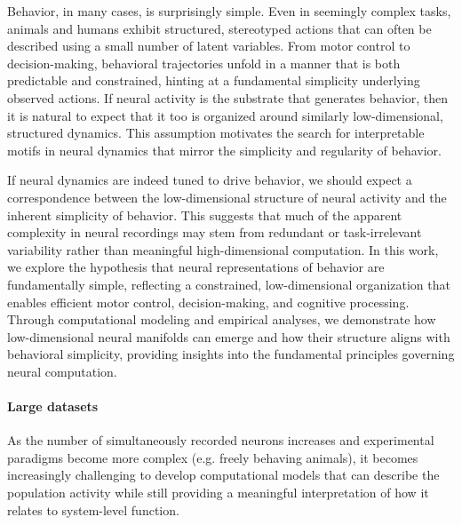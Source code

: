 \documentclass{article}
\theoremstyle{definition} \newtheorem{definition}{Definition}  \newtheorem{example}{Example}
\theoremstyle{remark} \newtheorem{remark}{Remark}
\newcounter{ct}
\begin{document}
Behavior, in many cases, is surprisingly simple. Even in seemingly complex tasks, animals and humans exhibit structured, stereotyped actions that can often be described using a small number of latent variables. From motor control to decision-making, behavioral trajectories unfold in a manner that is both predictable and constrained, hinting at a fundamental simplicity underlying observed actions.
If neural activity is the substrate that generates behavior, then it is natural to expect that it too is organized around similarly low-dimensional, structured dynamics. This assumption motivates the search for interpretable motifs in neural dynamics that mirror the simplicity and regularity of behavior.

If neural dynamics are indeed tuned to drive behavior, we should expect a correspondence between the low-dimensional structure of neural activity and the inherent simplicity of behavior.
 This suggests that much of the apparent complexity in neural recordings may stem from redundant or task-irrelevant variability rather than meaningful high-dimensional computation.
  In this work, we explore the hypothesis that neural representations of behavior are fundamentally simple, reflecting a constrained, low-dimensional organization that enables efficient motor control, decision-making, and cognitive processing.
 Through computational modeling and empirical analyses, we demonstrate how low-dimensional neural manifolds can emerge and how their structure aligns with behavioral simplicity, providing insights into the fundamental principles governing neural computation.
 
 
 
\paragraph{Large datasets}
 As the number of simultaneously recorded neurons increases and experimental paradigms become more complex (e.g. freely behaving animals), it becomes increasingly challenging to develop computational models that can describe the population activity while still providing a meaningful interpretation of how it relates to system-level function.
\end{document}
